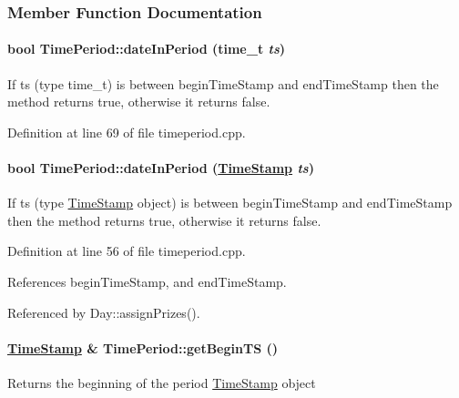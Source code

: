 \subsubsection{Member Function Documentation}
\hypertarget{classTimePeriod_TimePerioda7}{
\paragraph[dateInPeriod]{\setlength{\rightskip}{0pt plus 5cm}bool Time\-Period::date\-In\-Period (time\_\-t {\em ts})}\hfill}
\label{classTimePeriod_TimePerioda7}


If ts (type time\_\-t) is between begin\-Time\-Stamp and end\-Time\-Stamp then the method returns true, otherwise it returns false. 

Definition at line 69 of file timeperiod.cpp.\hypertarget{classTimePeriod_TimePerioda6}{
\paragraph[dateInPeriod]{\setlength{\rightskip}{0pt plus 5cm}bool Time\-Period::date\-In\-Period (\hyperlink{classTimeStamp}{Time\-Stamp} {\em ts})}\hfill}
\label{classTimePeriod_TimePerioda6}


If ts (type \hyperlink{classTimeStamp}{Time\-Stamp} object) is between begin\-Time\-Stamp and end\-Time\-Stamp then the method returns true, otherwise it returns false. 

Definition at line 56 of file timeperiod.cpp.

References begin\-Time\-Stamp, and end\-Time\-Stamp.

Referenced by Day::assign\-Prizes().\hypertarget{classTimePeriod_TimePerioda4}{
\paragraph[getBeginTS]{\setlength{\rightskip}{0pt plus 5cm}\hyperlink{classTimeStamp}{Time\-Stamp} \& Time\-Period::get\-Begin\-TS ()}\hfill}
\label{classTimePeriod_TimePerioda4}


Returns the beginning of the period \hyperlink{classTimeStamp}{Time\-Stamp} object 


